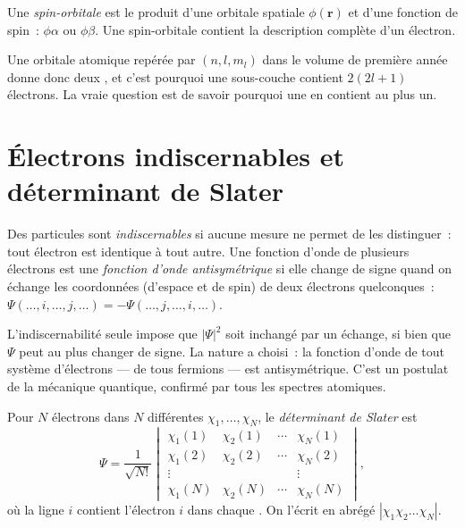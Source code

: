 \begin{definition}\label{def:b3:many-electron-atoms:spin-orbital}
Une \emph{spin-orbitale} est le produit d'une orbitale
spatiale
$\phi(\mathbf r)$ et d'une fonction de spin~: $\phi\alpha$ ou $\phi\beta$.
Une spin-orbitale contient la description complète d'un électron.
\end{definition}

Une orbitale atomique repérée par $(n, l, m_l)$ dans le volume de première
année donne donc deux , et c'est pourquoi une sous-couche
contient $2(2l+1)$ électrons. La vraie question est de savoir pourquoi
une  en contient au plus un.

\section{Électrons indiscernables et déterminant de Slater}

\begin{definition}\label{def:b3:many-electron-atoms:indistinguishable}
Des particules sont \emph{indiscernables} si
aucune mesure ne permet de les distinguer~: tout électron est identique à
tout autre. Une fonction d'onde de plusieurs électrons est une
\emph{fonction d'onde antisymétrique} si elle change de signe quand on
échange les coordonnées (d'espace et de spin) de deux électrons
quelconques~:
$\Psi(\dots,i,\dots,j,\dots) = -\Psi(\dots,j,\dots,i,\dots)$.
\end{definition}

L'indiscernabilité seule impose que $|\Psi|^2$ soit inchangé par un
échange, si bien que $\Psi$ peut au plus changer de signe. La nature a
choisi~: la fonction d'onde de tout système d'électrons --- de tous
fermions --- est antisymétrique. C'est un postulat de la mécanique
quantique, confirmé par tous les spectres atomiques.

\begin{definition}\label{def:b3:many-electron-atoms:slater}
Pour $N$ électrons dans $N$  différentes $\chi_1, \dots, \chi_N$, le
\emph{déterminant de Slater} est
\[
\Psi = \frac{1}{\sqrt{N!}}\begin{vmatrix}
\chi_1(1) & \chi_2(1) & \cdots & \chi_N(1)\\
\chi_1(2) & \chi_2(2) & \cdots & \chi_N(2)\\
\vdots & & & \vdots\\
\chi_1(N) & \chi_2(N) & \cdots & \chi_N(N)
\end{vmatrix},
\]
où la ligne $i$ contient l'électron $i$ dans chaque . On
l'écrit en abrégé
$|\chi_1\chi_2\dots\chi_N|$.
\end{definition}

